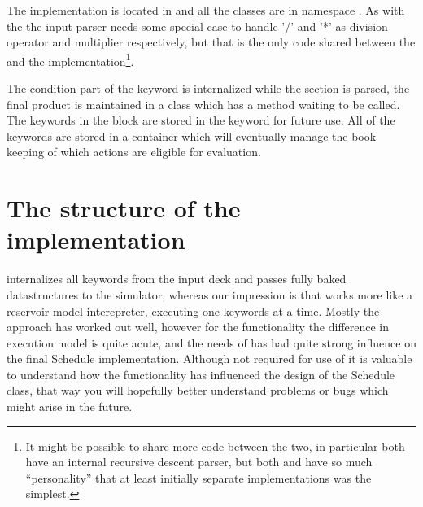 The \actionx{} implementation is located in
 and all the classes are in namespace
. As with the \udq{} the input parser needs some special
case to handle '/' and '*' as division operator and multiplier respectively, but
that is the only code shared between the \udq{} and the \actionx{}
implementation\footnote{It might be possible to share more code between the two,
in particular both have an internal recursive descent parser, but both \udq{}
and \actionx{} have so much ``personality'' that at least initially separate
implementations was the simplest.}.

The condition part of the \actionx{} keyword is internalized while the
 section is parsed, the final product is maintained in a class
 which has a  method waiting to
be called. The keywords in the \actionx{} block are stored in the
 keyword for future use. All of the \actionx{}
keywords are stored in a container  which will
eventually manage the book keeping of which actions are eligible for evaluation.

\section{The structure of the  implementation}
\label{schedule_design}
\flow{} internalizes all keywords from the input deck and passes fully baked
datastructures to the simulator, whereas our impression is that \eclipse{} works
more like a reservoir model interepreter, executing one keywords at a time.
Mostly the \flow{} approach has worked out well, however for the \actionx{}
functionality the difference in execution model is quite acute, and the needs of
\actionx{} has had quite strong influence on the final Schedule implementation.
Although not required for use of \actionx{} it is valuable to understand how the
\actionx{} functionality has influenced the design of the Schedule class, that
way you will hopefully better understand problems or bugs which might arise in
the future.

